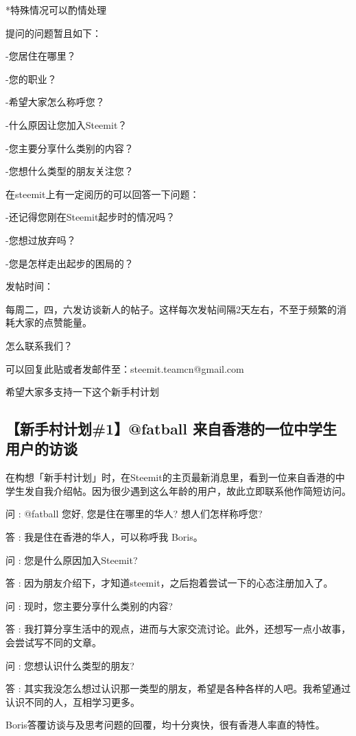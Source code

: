 \documentclass[]{ctexbook}
\begin{document}
*特殊情况可以酌情处理

提问的问题暂且如下：

-您居住在哪里？

-您的职业？

-希望大家怎么称呼您？

-什么原因让您加入Steemit？

-您主要分享什么类别的内容？

-您想什么类型的朋友关注您？

在steemit上有一定阅历的可以回答一下问题：

-还记得您刚在Steemit起步时的情况吗？

-您想过放弃吗？

-您是怎样走出起步的困局的？

发帖时间：

每周二，四，六发访谈新人的帖子。这样每次发帖间隔2天左右，不至于频繁的消耗大家的点赞能量。

怎么联系我们？

可以回复此贴或者发邮件至：steemit.teamcn@gmail.com

希望大家多支持一下这个新手村计划

\hypertarget{1fatball-}{%
\subsection{【新手村计划\#1】@fatball 来自香港的一位中学生用户的访谈}\label{1fatball-}}

在构想「新手村计划」时，在Steemit的主页最新消息里，看到一位来自香港的中学生发自我介绍帖。因为很少遇到这么年龄的用户，故此立即联系他作简短访问。

问 : @fatball 您好, 您是住在哪里的华人? 想人们怎样称呼您?

答 : 我是住在香港的华人，可以称呼我 Boris。

问 : 您是什么原因加入Steemit?

答 : 因为朋友介绍下，才知道steemit，之后抱着尝试一下的心态注册加入了。

问 : 现时，您主要分享什么类别的内容?

答 : 我打算分享生活中的观点，进而与大家交流讨论。此外，还想写一点小故事，会尝试写不同的文章。

问 : 您想认识什么类型的朋友?

答 : 其实我没怎么想过认识那一类型的朋友，希望是各种各样的人吧。我希望通过认识不同的人，互相学习更多。

Boris答覆访谈与及思考问题的回覆，均十分爽快，很有香港人率直的特性。
\end{document}

